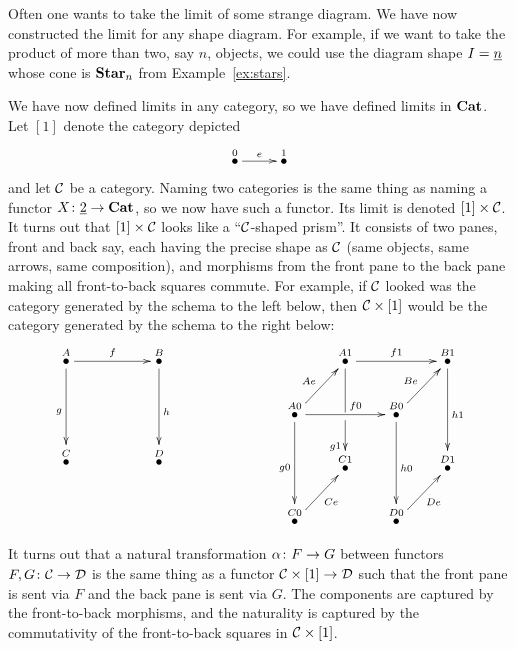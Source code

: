 \documentclass[CT4S-EN-RU]{subfiles}
\begin{document}
\begin{exampleENG}
Often one wants to take the limit of some strange diagram. We have now constructed the limit for any shape diagram. For example, if we want to take the product of more than two, say $n$, objects, we could use the diagram shape $I=\underline{n}$ whose cone is ${\mathbf{Star}}_n$ from Example~\ref{ex:stars}.
\end{exampleENG}

\begin{exampleRUS}
\end{exampleRUS}

\begin{exampleENG}\label{ex:product version of nat trans}
We have now defined limits in any category, so we have defined limits in ${\mathbf{Cat}}$. Let $[1]$ denote the category depicted 
$$\xymatrix{\LMO{0}\ar[r]^e&\LMO{1}}$$
and let $\mathcal{C}$ be a category. Naming two categories is the same thing as naming a functor $X\colon\underline{2}\rightarrow{\mathbf{Cat}}$, so we now have such a functor. Its limit is denoted $[1]\times\mathcal{C}$. It turns out that $[1]\times\mathcal{C}$ looks like a “$\mathcal{C}$-shaped prism”. It consists of two panes, front and back say, each having the precise shape as $\mathcal{C}$ (same objects, same arrows, same composition), and morphisms from the front pane to the back pane making all front-to-back squares commute. For example, if $\mathcal{C}$ looked was the category generated by the schema to the left below, then $\mathcal{C}\times[1]$ would be the category generated by the schema to the right below:
$$
\xymatrix{
\LMO{A}\ar[rr]^f\ar[dd]_g&&\LMO{B}\ar[dd]^h\\\\\LMO{C}&&\LMO{D}
}
\hspace{1in}
\xymatrix@=20pt{
&\LMO{A1}\ar[rr]^{f1}\ar'[d][dd]_(.6){g1}&&\LMO{B1}\ar[dd]^{h1}\\
\LMO{A0}\ar[ur]^{Ae}\ar[rr]^(.6){f0}\ar[dd]_{g0}&&\LMO{B0}\ar[ur]^{Be}\ar[dd]^{h0}\\
&\LMO{C1}&&\LMO{D1}\\
\LMO{C0}\ar[ur]_{Ce}&&\LMO{D0}\ar[ur]_{De}&
}
$$

It turns out that a natural transformation $\alpha\colon F\rightarrow G$ between functors $F,G\colon\mathcal{C}\rightarrow\mathcal{D}$ is the same thing as a functor $\mathcal{C}\times[1]\rightarrow\mathcal{D}$ such that the front pane is sent via $F$ and the back pane is sent via $G$. The components are captured by the front-to-back morphisms, and the naturality is captured by the commutativity of the front-to-back squares in $\mathcal{C}\times[1]$.
\end{exampleENG}
\end{document}
